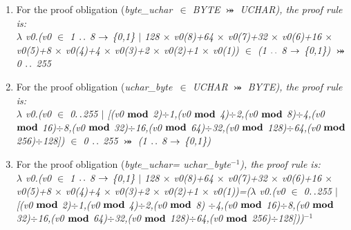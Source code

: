 \documentclass[a4paper]{llncs}
\begin{document}
\begin{enumerate}

\item For the proof obligation (\it byte\_uchar\rm \ $\in$ \textit{BYTE} $\bij$
\textit{UCHAR}), the proof rule is:\\
$\lambda$ \it v0\rm .\rm (\it v0 $\in$  \rm 1 $\upto$ \rm 8  $\fun$  \rm \{\rm 0\rm ,\rm 1\rm \}  $\mid$  \rm 1\rm 2\rm 8 $\times$ \it v0\rm (\rm 8\rm )\rm +\rm 6\rm 4 $\times$ \it v0\rm (\rm 7\rm )\rm +\rm 3\rm 2 $\times$ \it v0\rm (\rm 6\rm )\rm +\rm 1\rm 6 $\times$ \it v0\rm (\rm 5\rm )\rm +\rm 8 $\times$ \it v0\rm (\rm 4\rm )\rm +\rm 4 $\times$ \it v0\rm (\rm 3\rm )\rm +\rm 2 $\times$ \it v0\rm (\rm 2\rm )\rm +\rm 1 $\times$ \it v0\rm (\rm 1\rm )\rm ) \rm $\in$ \rm (\rm 1 $\upto$ \rm 8  $\fun$  \rm \{\rm 0\rm ,\rm 1\rm \}\rm )  $\bij$  \rm 0 $\upto$ \rm 2\rm 5\rm 5 \\

\item For the proof obligation (\it uchar\_byte\rm \ $\in$ \textit{UCHAR} $\bij$
\textit{BYTE}), the proof rule is:\\ $\lambda$ \it v0\rm .\rm (\it v0 $\in$  \rm 0$\upto$255  $\mid$  \rm \rm  [(\it v0  $\mod$  \rm 2)$\div$1,(\it v0  $\mod$  \rm 4)$\div$\rm 2\rm,(\it v0  $\mod$  \rm 8)$\div$\rm 4\rm,(\it v0  $\mod$  \rm 16)$\div$\rm 8\rm,(\it v0  $\mod$  \rm 32)$\div$\rm 1\rm 6\rm,(\it v0  $\mod$  \rm 6\rm 4)$\div$\rm 3\rm 2\rm,(\it v0  $\mod$  \rm 1\rm 2\rm 8)$\div$\rm 6\rm 4\rm,(\it v0  $\mod$  \rm 2\rm 5\rm 6)$\div$\rm 1\rm 2\rm 8\rm \rm ]\rm ) \rm   $\in$  \rm 0 $\upto$ \rm 2\rm 5\rm 5   $\bij$ \rm (\rm 1 $\upto$ \rm 8  $\fun$  \rm \{\rm 0\rm ,\rm 1\rm \}\rm )\\


\item For the proof obligation (\it byte\_uchar\rm  =  \it
uchar\_byte\rm$^{-1}$), the proof rule is:\\ $\lambda$ \it v0\rm .\rm (\it v0 $\in$  \rm 1 $\upto$ \rm 8  $\fun$  \rm \{\rm 0\rm ,\rm 1\rm \}  $\mid$  \rm 1\rm 2\rm 8 $\times$ \it v0\rm (\rm 8\rm )\rm +\rm 6\rm 4 $\times$ \it v0\rm (\rm 7\rm )\rm +\rm 3\rm 2 $\times$ \it v0\rm (\rm 6\rm )\rm +\rm 1\rm 6 $\times$ \it v0\rm (\rm 5\rm )\rm +\rm 8 $\times$ \it v0\rm (\rm 4\rm )\rm +\rm 4 $\times$ \it v0\rm (\rm 3\rm )\rm +\rm 2 $\times$ \it v0\rm (\rm 2\rm )\rm +\rm 1 $\times$ \it v0\rm (\rm 1\rm )\rm )=($\lambda$ \it v0\rm .\rm (\it v0 $\in$  \rm 0$\upto$255  $\mid$  \rm \rm  [(\it v0  $\mod$  \rm 2)$\div$1,(\it v0  $\mod$  \rm 4)$\div$\rm 2\rm,(\it v0  $\mod$ \rm 8) $\div$\rm 4\rm,(\it v0  $\mod$  \rm 16)$\div$\rm 8\rm,(\it v0  $\mod$  \rm 32)$\div$\rm 1\rm 6\rm,(\it v0  $\mod$ \rm 6\rm 4)$\div$\rm 3\rm 2\rm,(\it v0  $\mod$  \rm 1\rm 2\rm 8)$\div$\rm 6\rm 4\rm,(\it v0  $\mod$  \rm 2\rm 5\rm 6)$\div$\rm 1\rm 2\rm 8\rm \rm ]\rm )\rm)$^{-1}$
\end{enumerate}
\end{document}
